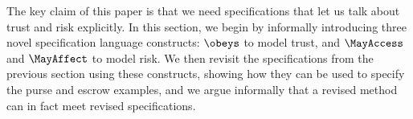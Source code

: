 The key claim of this paper is that we need specifications that let us
talk about trust and risk explicitly.  In this section, we begin by
informally introducing three novel specification language constructs:
$\obeys$ to model trust, and $\MayAccess$ and $\MayAffect$ to model
risk.  We then revisit the %
specifications from the previous
section using these constructs, showing how they can be used to
specify the purse and escrow examples, and we argue informally that a
revised  method can in fact meet revised specifications.





